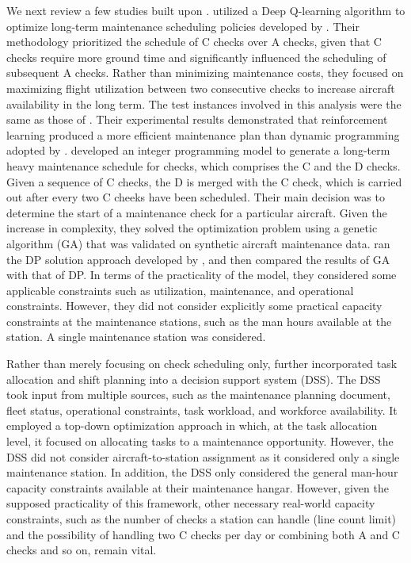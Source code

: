We next review a few studies built upon \cite{deng2020practical}. \cite{andrade2021aircraft} 
utilized a Deep Q-learning algorithm to optimize long-term maintenance scheduling policies developed by  \cite{deng2020practical}. Their methodology prioritized the schedule of C checks over A checks, given that C checks require more ground time and significantly influenced the scheduling of subsequent A checks. 
Rather than minimizing maintenance costs, they focused on maximizing flight utilization between two consecutive checks to increase aircraft availability in the long term. The test instances involved in this analysis were the same as those of \cite{deng2020practical}.
Their experimental results demonstrated that reinforcement learning produced a more efficient maintenance plan than dynamic programming adopted by \cite{deng2020practical}.
\color{black}
\cite{van2022robust} developed an integer programming model to generate a long-term heavy maintenance schedule for checks, which comprises the C and the D checks. Given a sequence of C checks, the D is merged with the C check, which is carried out after every two C cheeks have been scheduled. Their main decision was to determine the start of a maintenance check for a particular aircraft. Given the increase in complexity, they solved the optimization problem using a genetic algorithm (GA) that was validated on synthetic aircraft maintenance data. \cite{van2022robust}  ran the DP solution approach developed by  \cite{deng2020practical}, and then compared the results of GA with that of DP. In terms of the practicality of the model, they considered some applicable constraints such as utilization, maintenance, and operational constraints. However, they did not consider explicitly some practical capacity constraints at the maintenance stations, such as the man hours available at the station. A single maintenance station was considered. 

Rather than merely focusing on check scheduling only,  \cite{deng2020practical} further incorporated task allocation and shift planning into a decision support system (DSS). \color{black} The DSS took input from multiple sources, such as the maintenance planning document, fleet status, operational constraints, task workload, and workforce availability. It employed a top-down optimization approach in which, at the task allocation level, it focused on allocating tasks to a maintenance opportunity. 
However, the DSS did not consider aircraft-to-station assignment as it considered only a single maintenance station. In addition, the DSS only considered the general man-hour capacity constraints available at their maintenance hangar. However, given the supposed practicality of this framework, other necessary real-world capacity constraints, such as the number of checks a station can handle (line count limit) and the possibility of handling two C checks per day or combining both A and C checks and so on, remain vital. 

